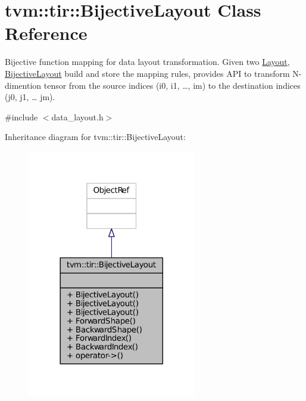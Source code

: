 \hypertarget{classtvm_1_1tir_1_1BijectiveLayout}{}\section{tvm\+:\+:tir\+:\+:Bijective\+Layout Class Reference}
\label{classtvm_1_1tir_1_1BijectiveLayout}


Bijective function mapping for data layout transformation. Given two \hyperlink{classtvm_1_1tir_1_1Layout}{Layout}, \hyperlink{classtvm_1_1tir_1_1BijectiveLayout}{Bijective\+Layout} build and store the mapping rules, provides A\+PI to transform N-\/dimention tensor from the source indices (i0, i1, …, im) to the destination indices (j0, j1, … jm).  




{\ttfamily \#include $<$data\+\_\+layout.\+h$>$}



Inheritance diagram for tvm\+:\+:tir\+:\+:Bijective\+Layout\+:
\nopagebreak
\begin{figure}[H]
\begin{center}
\leavevmode
\includegraphics[width=209pt]{classtvm_1_1tir_1_1BijectiveLayout__inherit__graph}
\end{center}
\end{figure}


